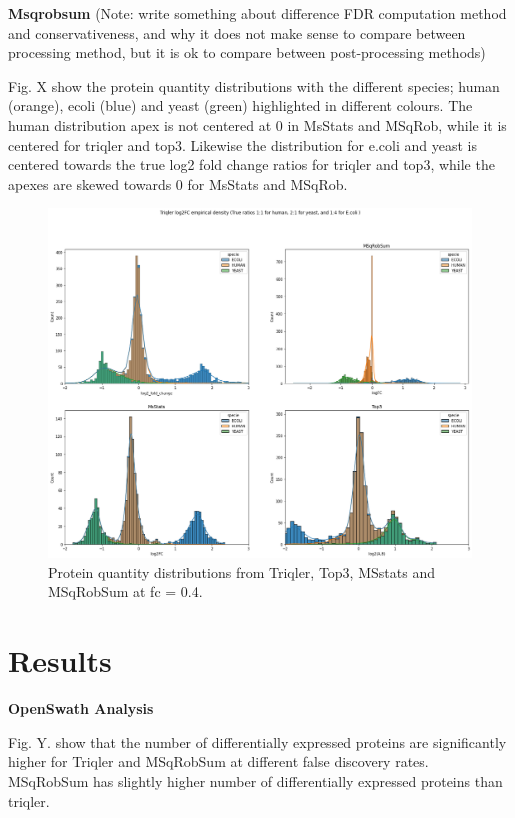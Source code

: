 \documentclass[10pt,letterpaper]{article}
\begin{document}
\textbf{Msqrobsum}
(Note: write something about difference FDR computation method and conservativeness, and why it does not make sense to compare between processing method, but it is ok to compare between post-processing methods)

Fig. X show the protein quantity distributions with the different species; human (orange), ecoli (blue) and yeast (green) highlighted in different colours. The human distribution apex is not centered at 0 in MsStats and MSqRob, while it is centered for triqler and top3. Likewise the distribution for e.coli and yeast is centered towards the true log2 fold change ratios for triqler and top3, while the apexes are skewed towards 0 for MsStats and MSqRob.    

\begin{figure}[htp]
    \centering
    \includegraphics[width=12cm]{../../result/2021-08-13_docs_plots/intensity_plot.png}
    \caption{Protein quantity distributions from Triqler, Top3, MSstats and MSqRobSum at fc = 0.4.}
    \label{fig:intensity_distribution}
\end{figure}


\section*{Results}


\textbf{OpenSwath Analysis}

Fig. Y. show that the number of differentially expressed proteins are significantly higher for Triqler and MSqRobSum at different false discovery rates. MSqRobSum has slightly higher number of differentially expressed proteins than triqler. 
\end{document}
